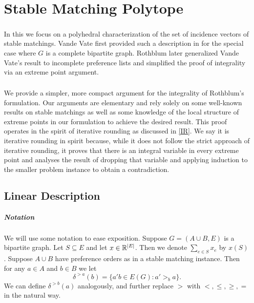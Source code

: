 \chapter{Stable Matching Polytope}
\paragraph{}
In this we focus on a polyhedral characterization of the set of
incidence vectors of stable matchings.  Vande Vate first provided such
a description in \cite{vate1989linear} for the special case where $G$
is a complete bipartite graph.  Rothblum \cite{rothblum1992characterization} later generalized Vande Vate's result to incomplete preference lists and simplified the proof of integrality via an extreme point argument.
\paragraph{}
We provide a simpler, more compact argument for the integrality of Rothblum's formulation. Our arguments are elementary and rely solely on some well-known results on stable matchings as well as some knowledge of the local structure of extreme points in our formulation to achieve the desired result. This proof operates in the spirit of iterative rounding as discussed in \ref{IR}. We say it is iterative rounding in spirit because, while it does not follow the strict approach of iterative rounding, it proves that there is an integral variable in every extreme point and analyses the result of dropping that variable and applying induction to the smaller problem instance to obtain a contradiction.
\section{Linear Description}
\paragraph{Notation}
We will use some notation to ease exposition. Suppose $G=(A\cup B, E)$ is a bipartite graph. Let $S \subseteq E$ and let $x \in \mathbb{R}^{\left|E\right|}$. Then we denote $\sum_{e\in S} x_e$ by $x(S)$. Suppose $A \cup B$ have preference orders as in a stable matching instance. Then for any $a\in A$ and $b \in B$ we let
$$\delta^{>a}(b) = \{a'b \in E(G): a' >_b a\}.$$
We can define $\delta^{>b}(a)$ analogously, and further replace $>$ with $<, \leq, \geq, =$ in the natural way.
